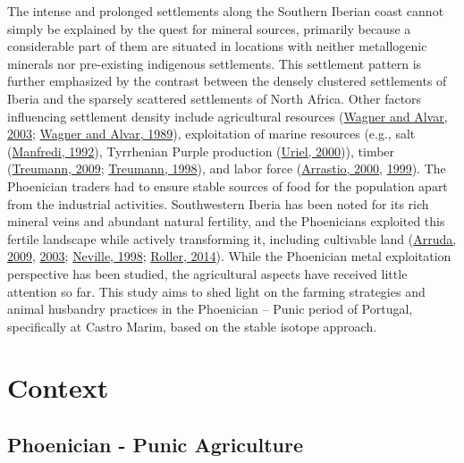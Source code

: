 \documentclass[3p]{elsarticle} %
\begin{document}
The intense and prolonged settlements along the Southern Iberian coast cannot simply be explained by the quest for mineral sources, primarily because a considerable part of them are situated in locations with neither metallogenic minerals nor pre-existing indigenous settlements. This settlement pattern is further emphasized by the contrast between the densely clustered settlements of Iberia and the sparsely scattered settlements of North Africa. Other factors influencing settlement density include agricultural resources (\protect\hyperlink{ref-wagner_alvar03}{Wagner and Alvar, 2003}; \protect\hyperlink{ref-wagner_alvar89}{Wagner and Alvar, 1989}), exploitation of marine resources (e.g., salt (\protect\hyperlink{ref-manfredi92}{Manfredi, 1992}), Tyrrhenian Purple production (\protect\hyperlink{ref-uriel00}{Uriel, 2000})), timber (\protect\hyperlink{ref-treumann09}{Treumann, 2009}; \protect\hyperlink{ref-treumann98}{Treumann, 1998}), and labor force (\protect\hyperlink{ref-arrastio00}{Arrastio, 2000}, \protect\hyperlink{ref-arrastio99}{1999}). The Phoenician traders had to ensure stable sources of food for the population apart from the industrial activities. Southwestern Iberia has been noted for its rich mineral veins and abundant natural fertility, and the Phoenicians exploited this fertile landscape while actively transforming it, including cultivable land (\protect\hyperlink{ref-arruda09}{Arruda, 2009}, \protect\hyperlink{ref-arruda03}{2003}; \protect\hyperlink{ref-neville98}{Neville, 1998}; \protect\hyperlink{ref-roller14}{Roller, 2014}). While the Phoenician metal exploitation perspective has been studied, the agricultural aspects have received little attention so far. This study aims to shed light on the farming strategies and animal husbandry practices in the Phoenician -- Punic period of Portugal, specifically at Castro Marim, based on the stable isotope approach.

\hypertarget{context}{%
\section{Context}\label{context}}

\hypertarget{phoenician---punic-agriculture}{%
\subsection{Phoenician - Punic Agriculture}\label{phoenician---punic-agriculture}}
\end{document}
